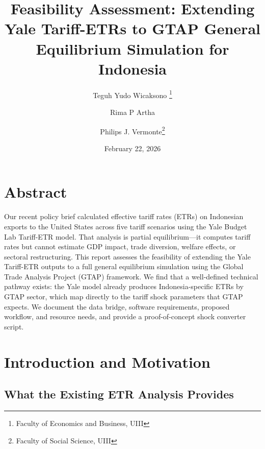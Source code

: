 \documentclass[12pt,a4paper]{article}
\begin{document}
\title{\textbf{Feasibility Assessment: Extending Yale Tariff-ETRs to GTAP General Equilibrium Simulation for Indonesia}}

\author[1]{Teguh Yudo Wicaksono \thanks{Faculty of Economics and Business, UIII}}
\author[1]{Rima P Artha}
\author[2]{Philips J. Vermonte\thanks{Faculty of Social Science, UIII}}

\date{February 22, 2026}
\onehalfspacing
\maketitle

\section*{Abstract}

Our recent policy brief calculated effective tariff rates (ETRs) on Indonesian exports to the United States across five tariff scenarios using the Yale Budget Lab Tariff-ETR model. That analysis is partial equilibrium---it computes tariff rates but cannot estimate GDP impact, trade diversion, welfare effects, or sectoral restructuring. This report assesses the feasibility of extending the Yale Tariff-ETR outputs to a full general equilibrium simulation using the Global Trade Analysis Project (GTAP) framework. We find that a well-defined technical pathway exists: the Yale model already produces Indonesia-specific ETRs by GTAP sector, which map directly to the tariff shock parameters that GTAP expects. We document the data bridge, software requirements, proposed workflow, and resource needs, and provide a proof-of-concept shock converter script.

\newpage
\tableofcontents
\newpage

\section{Introduction and Motivation}
\label{sec:introduction}

\subsection{What the Existing ETR Analysis Provides}
\end{document}
